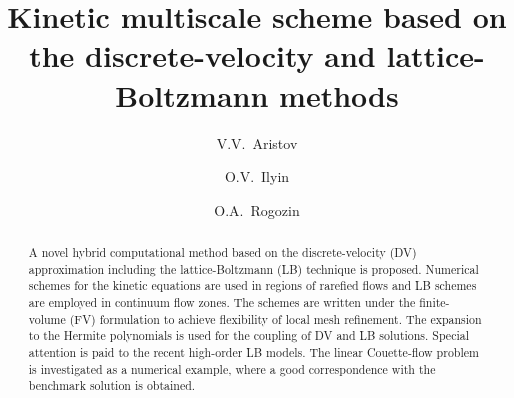 \documentclass[]{elsarticle} %
\begin{document}
\begin{frontmatter}

\title{Kinetic multiscale scheme based on the discrete-velocity and lattice-Boltzmann methods}

\author[ccas]{V.V.~Aristov}

\author[ccas]{O.V.~Ilyin }

\author[skoltech,ccas]{O.A.~Rogozin}



\address[ccas]{Dorodnicyn Computing Center,
    Federal Research Center "Computer Science and Control" of Russian Academy of Science, Moscow, Russia}
\address[skoltech]{Center for Design, Manufacturing, and Materials,
    Skolkovo Institute of Science and Technology, Moscow, Russia}

\begin{abstract}

A novel hybrid computational method based on the discrete-velocity (DV) approximation including the lattice-Boltzmann (LB) technique is proposed.
Numerical schemes for the kinetic equations are used in regions of rarefied flows and LB schemes are employed in continuum flow zones.
The schemes are written under the finite-volume (FV) formulation to achieve flexibility of local mesh refinement.
The expansion to the Hermite polynomials is used for the coupling of DV and LB solutions.
Special attention is paid to the recent high-order LB models.
The linear Couette-flow problem is investigated as a numerical example,
where a good correspondence with the benchmark solution is obtained.






\end{abstract}
\end{frontmatter}
\end{document}
